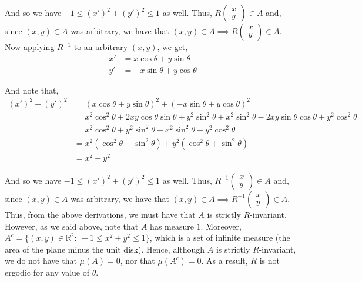 \documentclass[12pt]{article}
\begin{document}
And so we have $-1 \leq (x')^2 + (y')^2 \leq 1$ as well. Thus, $R \begin{pmatrix}
x \\ y
\end{pmatrix} \in A$ and, since $(x, y) \in A$ was arbitrary, we have that $(x, y) \in A \implies R \begin{pmatrix}
x \\ y
\end{pmatrix} \in A$.\\

Now applying $R^{-1}$ to an arbitrary $(x, y)$, we get,
\begin{align*}
x' &= x \cos \theta + y \sin \theta\\
y' &= -x \sin \theta + y \cos \theta
\end{align*}

And note that,
\begin{align*}
(x')^2 + (y')^2 &= (x \cos \theta + y \sin \theta)^2 + (-x \sin \theta + y \cos \theta)^2\\
&= x^2 \cos^2 \theta + 2xy \cos \theta \sin \theta + y^2 \sin^2 \theta + x^2 \sin^2 \theta - 2xy \sin \theta \cos \theta + y^2 \cos^2 \theta\\
&= x^2 \cos^2 \theta + y^2 \sin^2 \theta + x^2 \sin^2 \theta + y^2 \cos^2 \theta\\
&= x^2(\cos^2 \theta + \sin ^2 \theta) + y^2(\cos^2 \theta + \sin^2 \theta)\\
&= x^2 + y^2
\end{align*}

And so we have $-1 \leq (x')^2 + (y')^2 \leq 1$ as well. Thus, $R^{-1}\begin{pmatrix}
x \\ y
\end{pmatrix} \in A$ and, since $(x, y) \in A$ was arbitrary, we have that $(x, y) \in A \implies R^{-1}\begin{pmatrix}
x \\ y
\end{pmatrix} \in A$.\\

Thus, from the above derivations, we must have that $A$ is strictly $R$-invariant. However, as we said above, note that $A$ has measure $1$. Moreover, $A^c = \{(x, y) \in \mathbb{R}^2: \ -1 \leq x^2 + y^2 \leq 1\}$, which is a set of infinite measure (the area of the plane minus the unit disk). Hence, although $A$ is strictly $R$-invariant, we do not have that $\mu(A) = 0$, nor that $\mu(A^c) = 0$. As a result, $R$ is not ergodic for any value of $\theta$.
\end{document}
